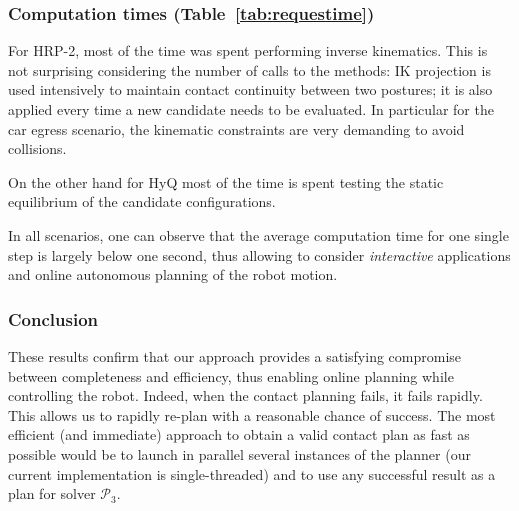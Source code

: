 \documentclass[journal]{IEEEtran}
\newcommand{\gls}[1]{\textit{#1}}
\providecommand{\DIFaddtex}[1]{#1} %
\providecommand{\DIFdeltex}[1]{} %
\providecommand{\DIFaddbegin}{\protect\color{blue}} %
\providecommand{\DIFaddend}{\protect\color{black}} %
\providecommand{\DIFdelbegin}{\protect\cbdelete} %
\providecommand{\DIFdelend}{} %
\providecommand{\DIFadd}[1]{\texorpdfstring{\DIFaddtex{#1}}{#1}} %
\providecommand{\DIFdel}[1]{\texorpdfstring{\DIFdeltex{#1}}{}} %
\begin{document}
\subsubsection{Computation times (Table~\ref{tab:requestime})}

For HRP-2, most of the time was spent performing inverse kinematics.
This is not surprising considering the number of calls to the methods: IK projection is used intensively to maintain contact continuity between two postures; 
it is also applied every time a new candidate needs to be evaluated. In particular for the car egress scenario,
the kinematic constraints are very demanding to avoid collisions.

On the other hand for HyQ most of the time is spent testing the static equilibrium of the candidate configurations.

In all scenarios, one can observe that the average computation time for one single step is largely below one second,
thus allowing to consider \gls{interactive} applications and online autonomous planning of the robot motion.

\DIFdelbegin \subsubsection{\DIFdel{Success rates (Table~\ref{tab:sucess_planning})}}
\addtocounter{subsubsection}{-1}%
\DIFdel{Despite the complexity of the scenarios and the approximations made in our formulation, our planner succeeded in the large majority of cases.
}%

\DIFdel{Table~\ref{tab:requestpercent} presents the rate of successful contact generation. Note that a failure in contact generation for a root configuration is not equivalent to a failure in the contact plan. It simply means that another limb was tested for contact generation for the same root configuration.
As expected, the more constrained scenario, the car egress, provides the less satisfying results, despite the high success rate of the planner.
}%

\DIFdelend \DIFaddbegin \subsubsection*{\DIFadd{Conclusion}}
\DIFaddend These results confirm that our approach provides a satisfying compromise between completeness and efficiency, thus \DIFdelbegin \DIFdel{allowing to consider }\DIFdelend \DIFaddbegin \DIFadd{enabling }\DIFaddend online planning
while controlling the robot. Indeed, when the contact planning fails, it fails rapidly. This allows us to rapidly re-plan with a reasonable chance of success.
The most efficient (and immediate) approach to obtain a valid contact plan as fast as possible would be to launch in parallel several instances of the planner (our current implementation is single-threaded) and to use any successful result as a plan for solver $\mathcal{P}_3$.
\end{document}
